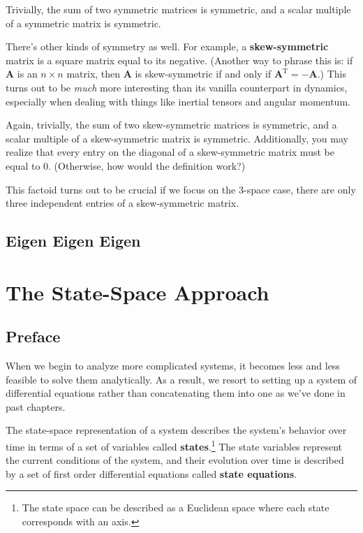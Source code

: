 \documentclass{report}
\begin{document}
\begin{onehalfspacing}
\begin{flushleft}
\medskip

Trivially, the sum of two symmetric matrices is symmetric, and a scalar multiple of a symmetric matrix is symmetric.

\medskip

There's other kinds of symmetry as well. For example, a \textbf{skew-symmetric} matrix is a square matrix equal to its negative. (Another way to phrase this is: if \textbf{A} is an \(n\times n\) matrix, then \textbf{A} is skew-symmetric if and only if \(\textbf{A}^\text{T} = -\textbf{A}\).) This turns out to be \textit{much} more interesting than its vanilla counterpart in dynamics, especially when dealing with things like inertial tensors and angular momentum.

\medskip

Again, trivially, the sum of two skew-symmetric matrices is symmetric, and a scalar multiple of a skew-symmetric matrix is symmetric. Additionally, you may realize that every entry on the diagonal of a skew-symmetric matrix must be equal to 0. (Otherwise, how would the definition work?) 

\medskip

This factoid turns out to be crucial if we focus on the 3-space case, there are only three independent entries of a skew-symmetric matrix.

\section{Eigen Eigen Eigen}

\chapter{The State-Space Approach}

\section*{Preface}

When we begin to analyze more complicated systems, it becomes less and less feasible to solve them analytically. As a result, we resort to setting up a system of differential equations rather than concatenating them into one as we've done in past chapters.

\medskip

The state-space representation of a system describes the system's behavior over time in terms of a set of variables called \textbf{states}.\footnote{The state space can be described as a Euclidean space where each state corresponds with an axis.} The state variables represent the current conditions of the system, and their evolution over time is described by a set of first order differential equations called \textbf{state equations}.


\end{flushleft}
\end{onehalfspacing}
\end{document}
